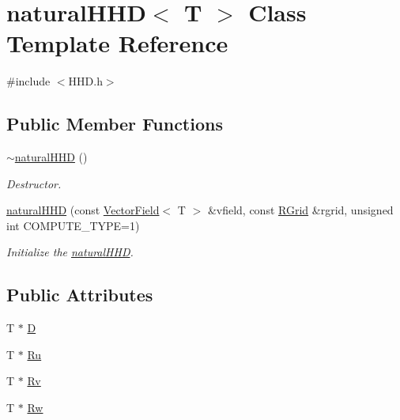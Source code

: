 \hypertarget{classnatural_h_h_d}{}\section{natural\+H\+H\+D$<$ T $>$ Class Template Reference}
\label{classnatural_h_h_d}


{\ttfamily \#include $<$H\+H\+D.\+h$>$}

\subsection*{Public Member Functions}
\begin{DoxyCompactItemize}
\item 
\hyperlink{classnatural_h_h_d_afbad6c810ff25731734a382ab69d91b0}{$\sim$natural\+H\+H\+D} ()
\begin{DoxyCompactList}\small\item\em Destructor. \end{DoxyCompactList}\item 
\hyperlink{classnatural_h_h_d_a44fac2b6a7410bcbdf9bc5bfcf66f0f0}{natural\+H\+H\+D} (const \hyperlink{class_vector_field}{Vector\+Field}$<$ T $>$ \&vfield, const \hyperlink{struct_r_grid}{R\+Grid} \&rgrid, unsigned int C\+O\+M\+P\+U\+T\+E\+\_\+\+T\+Y\+P\+E=1)
\begin{DoxyCompactList}\small\item\em Initialize the \hyperlink{classnatural_h_h_d}{natural\+H\+H\+D}. \end{DoxyCompactList}\end{DoxyCompactItemize}
\subsection*{Public Attributes}
\begin{DoxyCompactItemize}
\item 
T $\ast$ \hyperlink{classnatural_h_h_d_a14be6c70a1d6e7e110d231311bfd9353}{D}
\item 
T $\ast$ \hyperlink{classnatural_h_h_d_acf29795e943a83e27809523fe7b2182e}{Ru}
\item 
T $\ast$ \hyperlink{classnatural_h_h_d_abcc7900aa4db9c2a48d7cea957f0193d}{Rv}
\item 
T $\ast$ \hyperlink{classnatural_h_h_d_a4c5da0a3fb928591bfb286f065ddf735}{Rw}
\end{DoxyCompactItemize}
